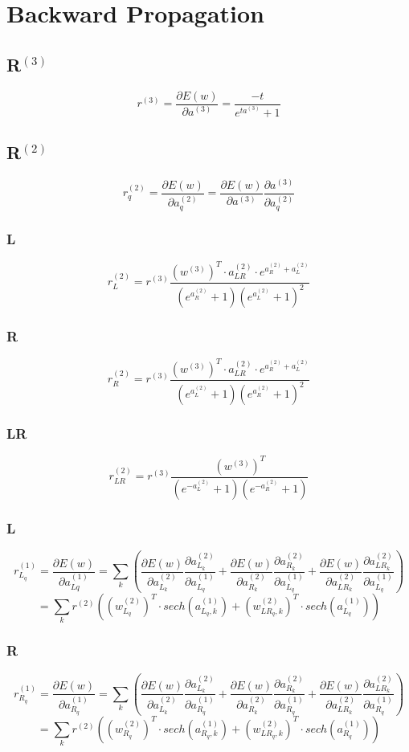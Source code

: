 \documentclass[11pt]{article}
\begin{document}
\section*{Backward Propagation}
\subsection*{R$^{(3)}$}
$$r^{(3)}=\frac{\partial E(w)}{\partial a^{(3)}} = \frac{-t}{e^{ta^{(3)}}+1}$$

\subsection*{R$^{(2)}$}
$$ r^{(2)}_{q} = \frac{\partial E(w)}{\partial a^{(2)}_q} = \frac{\partial E(w)}{\partial a^{(3)}}\frac{\partial a^{(3)}}{\partial a^{(2)}_q}  $$
\subsubsection*{L}
$$r^{(2)}_{L} = r^{(3)} \frac{(w^{(3)})^T \cdot a_{LR}^{(2)} \cdot e^{a_R^{(2)}+a_L^{(2)}}}{(e^{a_R^{(2)}}+1)(e^{a_L^{(2)}}+1)^2}$$

\subsubsection*{R}
$$r^{(2)}_{R} =r^{(3)} \frac{(w^{(3)})^T \cdot a_{LR}^{(2)} \cdot e^{a_R^{(2)}+a_L^{(2)}}}{(e^{a_L^{(2)}}+1)(e^{a_R^{(2)}}+1)^2}$$

\subsubsection*{LR}
$$r^{(2)}_{LR} =r^{(3)} \frac{(w^{(3)})^T}{(e^{-a_L^{(2)}}+1)(e^{-a_R^{(2)}}+1)}$$

\subsubsection*{L} 
$$r^{(1)}_{L_q} = \frac{\partial E(w)}{\partial a^{(1)}_{Lq}} =\sum_{k} ( \frac{\partial E(w)}{\partial a^{(2)}_{L_k}} \frac{\partial a^{(2)}_{L_k}}{\partial a^{(1)}_{L_q}} + \frac{\partial E(w)}{\partial a^{(2)}_{R_k}} \frac{\partial a^{(2)}_{R_k}}{\partial a^{(1)}_{L_q}} +  \frac{\partial E(w)}{\partial a^{(2)}_{LR_k}} \frac{\partial a^{(2)}_{LR_k}}{\partial a^{(1)}_{L_q}} )$$
$$= \sum_{k} r^{(2)} ( (w_{L_q}^{(2)})^T\cdot sech(a_{L_q,k}^{(1)}) + (w_{LR_q,k}^{(2)})^T\cdot sech(a_{L_q}^{(1)}) )$$

\subsubsection*{R}
$$r^{(1)}_{R_q} = \frac{\partial E(w)}{\partial a^{(1)}_{R_q}} =\sum_{k} ( \frac{\partial E(w)}{\partial a^{(2)}_{L_k}} \frac{\partial a^{(2)}_{L_k}}{\partial a^{(1)}_{R_q}} + \frac{\partial E(w)}{\partial a^{(2)}_{R_k}} \frac{\partial a^{(2)}_{R_k}}{\partial a^{(1)}_{R_q}} +  \frac{\partial E(w)}{\partial a^{(2)}_{LR_k}} \frac{\partial a^{(2)}_{LR_k}}{\partial a^{(1)}_{R_q}} )$$
$$=\sum_{k}  r^{(2)} ( (w_{R_q}^{(2)})^T\cdot sech(a_{R_q,k}^{(1)}) + (w_{LR_q,k}^{(2)})^T\cdot sech(a_{R_q}^{(1)}) )$$
\end{document}
